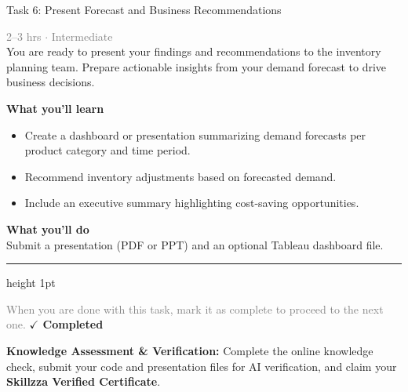 \documentclass[10pt,a4paper]{article}
\begin{document}
\begin{taskbox}{Task 6: Present Forecast and Business Recommendations}

    {\small \textcolor{gray}{2--3 hrs $\cdot$ Intermediate}}\\[12pt]

      
You are ready to present your findings and recommendations to the inventory planning team. Prepare actionable insights from your demand forecast to drive business decisions.  


\vspace{8pt}
{\large \textbf{\textcolor{brandLight}{What you'll learn}}}\\[4pt]  
\begin{itemize}
    \item Create a dashboard or presentation summarizing demand forecasts per product category and time period.  
    \item Recommend inventory adjustments based on forecasted demand.  
    \item Include an executive summary highlighting cost-saving opportunities.  
\end{itemize}

\vspace{8pt}
{\large \textbf{\textcolor{brandLight}{What you'll do}}}\\[4pt]  
Submit a presentation (PDF or PPT) and an optional Tableau dashboard file.\par

    \vspace{16pt}

    \textcolor{cardBorder}{\hrule height 1pt}\vspace{8pt}

    \small \textcolor{gray}{When you are done with this task, mark it as complete to proceed to the next one.} \hfill \textbf{\textcolor{brandDark}{$\checkmark$ Completed}}

\end{taskbox}

\begin{completionbox}
    \textbf{Knowledge Assessment \& Verification:} Complete the online knowledge check, submit your code and presentation files for AI verification, and claim your \textbf{Skillzza Verified Certificate}.
\end{completionbox}

\newpage

\end{document}
